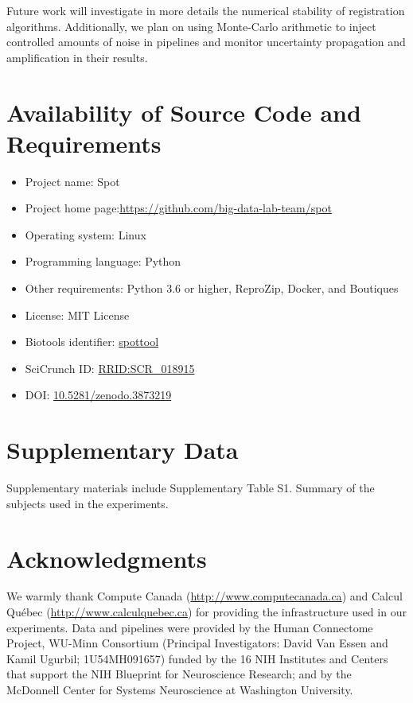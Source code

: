 \documentclass[a4paper,num-refs]{oup-contemporary}
\newcommand{\revised}[1]{\color{blue}#1\color{black}\xspace}
\newcommand{\reprozip}[0]{ReproZip\xspace}
\newcommand{\tristan}[1]{\color{orange}\textbf{From Tristan:}#1\color{black}}
\newcommand{\toolname}[0]{Spot\xspace}
\begin{document}
Future work will investigate in more details the numerical stability of
registration algorithms. Additionally, we plan on using Monte-Carlo arithmetic
to inject controlled amounts of noise in pipelines and monitor
uncertainty propagation and amplification in their results.

\revised{
\section{Availability of Source Code and Requirements}
\begin{itemize}
  \item Project name: \toolname
  \item Project home page:\url{https://github.com/big-data-lab-team/spot}
  \item Operating system: Linux
  \item Programming language: Python
  \item Other requirements: Python 3.6 or higher, \reprozip, Docker, and Boutiques
  \item License: MIT License
  \item Biotools identifier: \href{https://bio.tools/spottool}{spottool}
  \item SciCrunch ID: \href{https://scicrunch.org/scicrunch/Resources/record/nlx_144509-1/SCR_018915/resolver}{RRID:SCR\_018915}
  \item DOI: \href{https://doi.org/10.5281/zenodo.3873219}{10.5281/zenodo.3873219}


\end{itemize}

\section{Supplementary Data}
Supplementary materials include Supplementary Table S1. Summary of the subjects used in the experiments.
}

\section{Acknowledgments}

We warmly thank Compute Canada (\url{http://www.computecanada.ca}) and Calcul
Qu\'ebec (\url{http://www.calculquebec.ca}) for providing the infrastructure used in our experiments.
Data and pipelines were provided by the Human Connectome Project, WU-Minn
Consortium (Principal Investigators: David Van Essen and Kamil Ugurbil;
1U54MH091657) funded by the 16 NIH Institutes and Centers that support
the NIH Blueprint for Neuroscience Research; and by the McDonnell
Center for Systems Neuroscience at Washington University.






\end{document}

